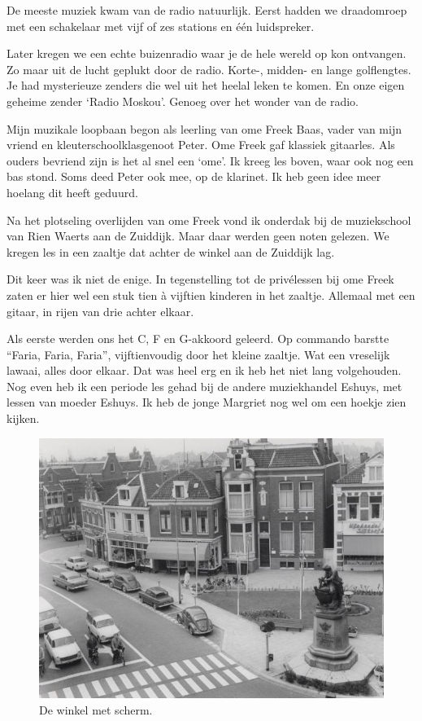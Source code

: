 \documentclass[12pt,twoside, openright]{memoir}
\begin{document}
De meeste muziek kwam van de radio natuurlijk. Eerst hadden we draadomroep met een schakelaar met vijf of zes stations en één luidspreker. 

Later kregen we een echte buizenradio waar je de hele wereld op kon ontvangen. Zo maar uit de lucht geplukt door de radio. Korte-, midden- en lange golflengtes. Je had mysterieuze zenders die wel uit het heelal leken te komen. En onze eigen geheime zender `Radio Moskou’. Genoeg over het wonder van de radio.

Mijn muzikale loopbaan begon als leerling van ome Freek Baas, vader van mijn vriend en kleuterschoolklasgenoot Peter. Ome Freek gaf klassiek gitaarles. Als ouders bevriend zijn is het al snel een `ome'. Ik kreeg les boven, waar ook nog een bas stond. Soms deed Peter ook mee, op de klarinet. Ik heb geen idee meer hoelang dit heeft geduurd. 

Na het plotseling overlijden van ome Freek vond ik onderdak bij de muziekschool van Rien Waerts aan de Zuiddijk. Maar daar werden geen noten gelezen. We kregen les in een zaaltje dat achter de winkel aan de Zuiddijk lag. 

Dit keer was ik niet de enige. In tegenstelling tot de privélessen bij ome Freek zaten er hier wel een stuk tien à vijftien kinderen in het zaaltje. Allemaal met een gitaar, in rijen van drie achter elkaar. 

Als eerste werden ons het C, F en G-akkoord geleerd. Op commando barstte “Faria, Faria, Faria”, vijftienvoudig door het kleine zaaltje. Wat een vreselijk lawaai, alles door elkaar. Dat was heel erg en ik heb het niet lang volgehouden. Nog even heb ik een periode les gehad bij de andere muziekhandel Eshuys, met lessen van moeder Eshuys. Ik heb de jonge Margriet nog wel om een hoekje zien kijken. 

\begin{figure}
\includegraphics[width=\textwidth]{img/ch23/Eshuijs}
\caption*{\footnotesize De winkel met scherm.}
\end{figure}
\end{document}
